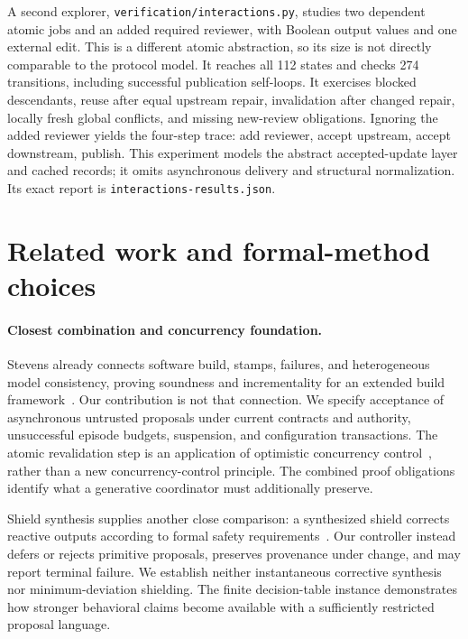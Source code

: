 \documentclass[pdflatex,sn-mathphys-num]{sn-jnl}
\theoremstyle{thmstyleone}
\theoremstyle{thmstylethree}
\theoremstyle{thmstyletwo}
\begin{document}
A second explorer, \texttt{verification/interactions.py}, studies two dependent atomic jobs and an added required reviewer, with Boolean output values and one external edit. This is a different atomic abstraction, so its size is not directly comparable to the protocol model. It reaches all 112 states and checks 274 transitions, including successful publication self-loops. It exercises blocked descendants, reuse after equal upstream repair, invalidation after changed repair, locally fresh global conflicts, and missing new-review obligations. Ignoring the added reviewer yields the four-step trace: add reviewer, accept upstream, accept downstream, publish. This experiment models the abstract accepted-update layer and cached records; it omits asynchronous delivery and structural normalization. Its exact report is \texttt{interactions-results.json}.

\section{Related work and formal-method choices}\label{sec:related}
\paragraph{Closest combination and concurrency foundation.} Stevens already connects software build, stamps, failures, and heterogeneous model consistency, proving soundness and incrementality for an extended build framework~\cite{megamodelbuild}. Our contribution is not that connection. We specify acceptance of asynchronous untrusted proposals under current contracts and authority, unsuccessful episode budgets, suspension, and configuration transactions. The atomic revalidation step is an application of optimistic concurrency control~\cite{occ}, rather than a new concurrency-control principle. The combined proof obligations identify what a generative coordinator must additionally preserve.

Shield synthesis supplies another close comparison: a synthesized shield corrects reactive outputs according to formal safety requirements~\cite{shield}. Our controller instead defers or rejects primitive proposals, preserves provenance under change, and may report terminal failure. We establish neither instantaneous corrective synthesis nor minimum-deviation shielding. The finite decision-table instance demonstrates how stronger behavioral claims become available with a sufficiently restricted proposal language.
\end{document}
